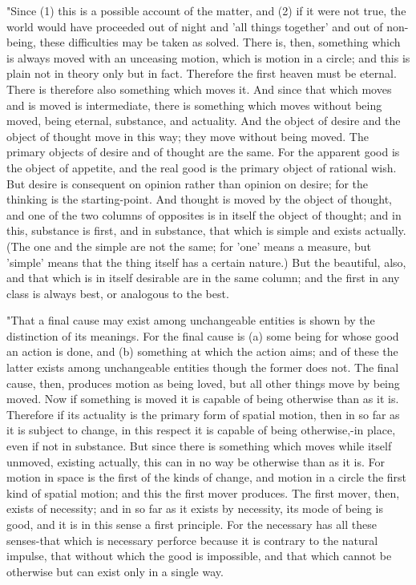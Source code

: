 "Since (1) this is a possible account of the matter, and (2) if it
were not true, the world would have proceeded out of night and 'all
things together' and out of non-being, these difficulties may be taken
as solved. There is, then, something which is always moved with an
unceasing motion, which is motion in a circle; and this is plain not
in theory only but in fact. Therefore the first heaven must be eternal.
There is therefore also something which moves it. And since that which
moves and is moved is intermediate, there is something which moves
without being moved, being eternal, substance, and actuality. And
the object of desire and the object of thought move in this way; they
move without being moved. The primary objects of desire and of thought
are the same. For the apparent good is the object of appetite, and
the real good is the primary object of rational wish. But desire is
consequent on opinion rather than opinion on desire; for the thinking
is the starting-point. And thought is moved by the object of thought,
and one of the two columns of opposites is in itself the object of
thought; and in this, substance is first, and in substance, that which
is simple and exists actually. (The one and the simple are not the
same; for 'one' means a measure, but 'simple' means that the thing
itself has a certain nature.) But the beautiful, also, and that which
is in itself desirable are in the same column; and the first in any
class is always best, or analogous to the best. 

"That a final cause may exist among unchangeable entities is shown
by the distinction of its meanings. For the final cause is (a) some
being for whose good an action is done, and (b) something at which
the action aims; and of these the latter exists among unchangeable
entities though the former does not. The final cause, then, produces
motion as being loved, but all other things move by being moved. Now
if something is moved it is capable of being otherwise than as it
is. Therefore if its actuality is the primary form of spatial motion,
then in so far as it is subject to change, in this respect it is capable
of being otherwise,-in place, even if not in substance. But since
there is something which moves while itself unmoved, existing actually,
this can in no way be otherwise than as it is. For motion in space
is the first of the kinds of change, and motion in a circle the first
kind of spatial motion; and this the first mover produces. The first
mover, then, exists of necessity; and in so far as it exists by necessity,
its mode of being is good, and it is in this sense a first principle.
For the necessary has all these senses-that which is necessary perforce
because it is contrary to the natural impulse, that without which
the good is impossible, and that which cannot be otherwise but can
exist only in a single way. 

